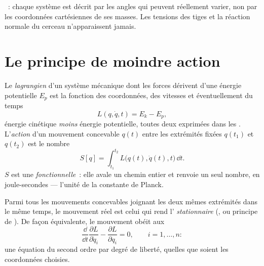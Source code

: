 \begin{omfigure}
{\small {}~: chaque système est décrit par les
angles qui peuvent réellement varier, non par les coordonnées
cartésiennes de ses masses. Les tensions des tiges et la réaction
normale du cerceau n'apparaissent jamais.}
\end{omfigure}

\section{Le principe de moindre action}

\begin{definition}\label{def:b3:lagrangian-mechanics:action}
Le \emph{lagrangien} d'un système mécanique dont les forces dérivent
d'une énergie potentielle $E_p$ est la fonction des coordonnées, des
vitesses et éventuellement du temps
\[
L(q, \dot q, t) = E_k - E_p ,
\]
énergie cinétique \emph{moins} énergie potentielle, toutes deux
exprimées dans les . L'\emph{action} d'un
mouvement concevable $q(t)$ entre les extrémités fixées $q(t_1)$ et
$q(t_2)$ est le nombre
\[
S[q] = \int_{t_1}^{t_2} L\big(q(t), \dot q(t), t\big)\,\dd t .
\]
$S$ est une \emph{fonctionnelle}~: elle avale un chemin entier et
renvoie un seul nombre, en joule-secondes --- l'unité de la constante
de Planck.
\end{definition}

\begin{theorem}\label{thm:b3:lagrangian-mechanics:euler-lagrange}
Parmi tous les mouvements concevables joignant les deux mêmes
extrémités dans le même temps, le mouvement réel est celui qui rend
l' \emph{stationnaire} (\emph{}, ou principe
de \emph{}). De façon équivalente, le mouvement obéit aux
\emph{}
\[
\frac{\dd}{\dd t}\frac{\partial L}{\partial\dot q_i}
 - \frac{\partial L}{\partial q_i} = 0 ,
\qquad i = 1, \dots, n :
\]
une équation du second ordre par degré de liberté, quelles que soient
les coordonnées choisies.
\end{theorem}

